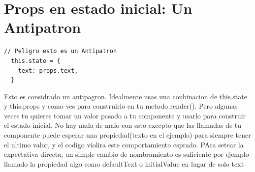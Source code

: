 \section{Props en estado inicial: Un Antipatron}
\begin{lstlisting}[language=html]
// Peligro esto es un Antipatron
  this.state = {
    text: props.text,
  }
\end{lstlisting}
Esto es considrado un antipagron. Idealmente usas una conbinacion de this.state y this.props y como ves para construirlo en tu metodo render(). Pero algunas veces tu quieres tomar un valor pasado a tu componente y usarlo para construir el estado inicial. No hay nada de malo con esto excepto que las llamadas de tu componente puede esperar una propiedad(texto en el ejemplo) para siempre tener el ultimo valor, y el codigo violira este comportamiento esprado. PAra setear la expectativa directa, un simple cambio de nombramiento es suficiente por ejemplo llamado la propiedad algo como defaultText o initialValue en lugar de solo text
